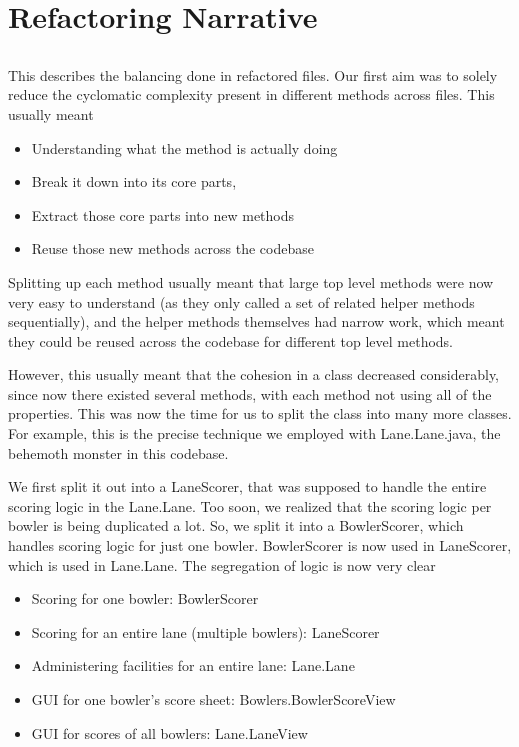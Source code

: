 \section{Refactoring Narrative}

\subsection{}

This describes the balancing done in refactored files. Our first aim was to solely reduce the cyclomatic complexity present in different methods across files. This usually meant

\begin{itemize}
    \item Understanding what the method is actually doing
    \item Break it down into its core parts,
    \item Extract those core parts into new methods
    \item Reuse those new methods across the codebase
\end{itemize}

Splitting up each method usually meant that large top level methods were now very easy to understand (as they only called a set of related helper methods sequentially), and the helper methods themselves had narrow work, which meant they could be reused across the codebase for different top level methods.

However, this usually meant that the cohesion in a class decreased considerably, since now there existed several methods, with each method not using all of the properties. This was now the time for us to split the class into many more classes. For example, this is the precise technique we employed with Lane.Lane.java, the behemoth monster in this codebase.

We first split it out into a LaneScorer, that was supposed to handle the entire scoring logic in the Lane.Lane. Too soon, we realized that the scoring logic per bowler is being duplicated a lot. So, we split it into a BowlerScorer, which handles scoring logic for just one bowler. BowlerScorer is now used in LaneScorer, which is used in Lane.Lane. The segregation of logic is now very clear

\begin{itemize}
    \item Scoring for one bowler: BowlerScorer
    \item Scoring for an entire lane (multiple bowlers): LaneScorer
    \item Administering facilities for an entire lane: Lane.Lane
    \item GUI for one bowler's score sheet: Bowlers.BowlerScoreView
    \item GUI for scores of all bowlers: Lane.LaneView
\end{itemize}


